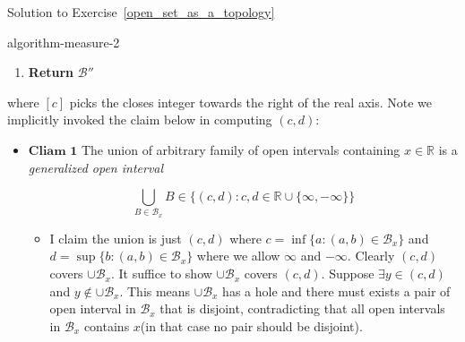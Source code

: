 \begin{mystsolution}{Solution to Exercise~\ref{open_set_as_a_topology}}
\begin{mystthmalgorithm}{}{algorithm-measure-2}
\begin{enumerate}
\begin{enumerate}
\item Compute $(c,d)=\bigcup_{B\in \mathcal B_x} B$ where $c,d$ is in extended real number system.
\item \textbf{If} $c,d\in \mathbb{R}$:

\begin{enumerate}
\item $\mathcal{B}_x'=\{(c,d)\}$
\end{enumerate}


\item \textbf{Else if} $c\in \mathbb{R}, d=\infty$:

\begin{enumerate}
\item $\mathcal{B}_x'\gets \{(c,[c])\}\cup \{[c],[c]+j\}_{j=1}^{\infty}$
\end{enumerate}


\item \textbf{Else}
Other cases follows as (3)
\item $\mathcal B'' = \mathcal B'' \cup \mathcal B_x '$
\end{enumerate}


\item \textbf{Return} $\mathcal B''$
\end{enumerate}

\end{mystthmalgorithm}
where $[c]$ picks the closes integer towards the right of the real axis.
Note we implicitly invoked the claim below in computing $(c,d)$:

\begin{itemize}
\item $\boxed{\textbf{Cliam 1}}$ The union of arbitrary family of open intervals containing $x\in \mathbb{R}$ is a \textit{generalized open interval}

\begin{equation}
\bigcup_{B\in \mathcal B_x} B\in \{(c,d): c,d\in \mathbb{R}\cup \{\infty, -\infty\}\}
\end{equation}

\begin{itemize}
\item I claim the union is just $(c,d)$ where $c=\inf \{a:(a,b)\in \mathcal B_x\}$ and $d=\sup \{b:(a,b)\in \mathcal B_x\}$ where we allow $\infty$ and $-\infty$. Clearly $(c,d)$ covers $\cup \mathcal B_x$. It suffice to show $\cup \mathcal B_x$ covers $(c,d)$. Suppose $\exists y \in (c,d)$ and $y\notin \cup \mathcal B_x$. This means $\cup \mathcal B_x$ has a hole and there must exists a pair of open interval in $\mathcal B_x$ that is disjoint, contradicting that all open intervals in $\mathcal B_x$ contains $x$(in that case no pair should be disjoint).
\end{itemize}
\end{itemize}


\end{mystsolution}
